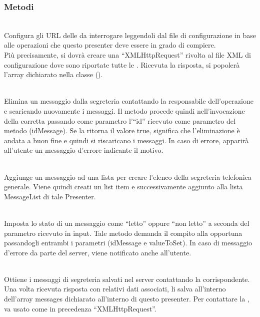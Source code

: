 \subsubsection*{Metodi}
\begin{description}
\item{}\\
Configura gli URL delle  da interrogare leggendoli dal file di configurazione in base alle operazioni che questo presenter deve essere in grado di compiere.\\
Più precisamente, si dovrà creare una ``XMLHttpRequest'' rivolta al file XML di configurazione dove sono riportate tutte le . Ricevuta la risposta, si popolerà l'array dichiarato nella classe ().

\item{}\\
Elimina un messaggio dalla segreteria contattando la  responsabile dell'operazione e scaricando nuovamente i messaggi. Il metodo procede quindi nell'invocazione della  corretta passando come parametro l'``id'' ricevuto come parametro del metodo (idMessage). Se la  ritorna il valore true, significa che l'eliminazione è andata a buon fine e quindi si riscaricano i messaggi. In caso di errore, apparirà all'utente un messaggio d'errore indicante il motivo.

\item{}\\
Aggiunge un messaggio ad una lista per creare l'elenco della segreteria telefonica generale. Viene quindi creati un list item e successivamente aggiunto alla lista MessageList di tale Presenter.

\item{}\\
Imposta lo stato di un messaggio come ``letto'' oppure ``non letto'' a seconda del parametro ricevuto in input. Tale metodo demanda il compito alla  opportuna passandogli entrambi i parametri (idMessage e valueToSet). In caso di messaggio d'errore da parte del server, viene notificato anche all'utente.

\item{}\\
Ottiene i messaggi di segreteria salvati nel server contattando la  corrispondente. Una volta ricevuta risposta con relativi dati associati, li salva all'interno dell'array messages dichiarato all'interno di questo presenter. Per contattare la , va usato come in precedenza ``XMLHttpRequest''.


\end{description}
